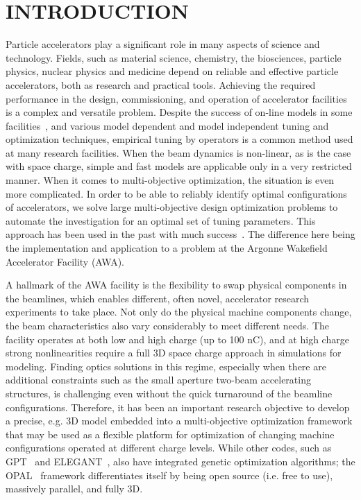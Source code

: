 \documentclass[preprint,linenumbers,amsmath,amssymb,aps,prstab]{revtex4-1}%
\begin{document}
\section{INTRODUCTION} \label{sec:introduction}

Particle accelerators play a significant role in many aspects of science and
  technology.
Fields, such as material science, chemistry, the biosciences, particle
  physics, nuclear physics and medicine depend on reliable and effective
  particle accelerators, both as research and practical tools.
Achieving the required performance in the design, commissioning, and operation
  of accelerator facilities is a complex and versatile problem.
Despite the success of on-line models in some facilities~\cite{xiaobiao}, 
and various model dependent and model independent tuning and optimization techniques, 
empirical tuning by operators is a common method used at many research facilities.
When the beam dynamics is non-linear, as is the case with space charge, 
simple and fast models are applicable only in a very restricted manner. 
When it comes to multi-objective optimization, the situation is even more complicated.
In order to be able to reliably identify optimal configurations of
  accelerators, we solve large multi-objective design optimization
  problems to automate the investigation for an optimal set of tuning parameters.
  This approach has been used in the past with much success~\cite{hofler13,bazarov05,yrss:09,jefferson,gull1,gull2}.
The difference here being the implementation and application to a 
problem at the Argonne Wakefield Accelerator Facility (AWA).

A hallmark of the AWA facility is the flexibility to swap physical
components in the beamlines, which enables different, often novel,
accelerator research experiments to take place.  Not only do the
physical machine components change, the beam characteristics also vary
considerably to meet different needs.  The facility operates at both low
and high charge (up to 100 nC), and at high charge strong nonlinearities
require a full 3D space charge approach in simulations for modeling.  
Finding optics solutions in this regime, especially when
there are additional constraints such as the small aperture two-beam
accelerating structures, is challenging even without the quick
turnaround of the beamline configurations.  Therefore, it has been an
important research objective to develop a precise, e.g. 3D model
embedded into a multi-objective optimization framework that may be used
as a flexible platform for optimization of changing machine
configurations operated at different charge levels. While other codes,
such as GPT~\cite{gpt} and ELEGANT~\cite{elegant}, also have
integrated genetic optimization algorithms; the OPAL~\cite{opal} framework
differentiates itself by being open source (i.e. free to use), massively
parallel, and fully 3D.
\end{document}
